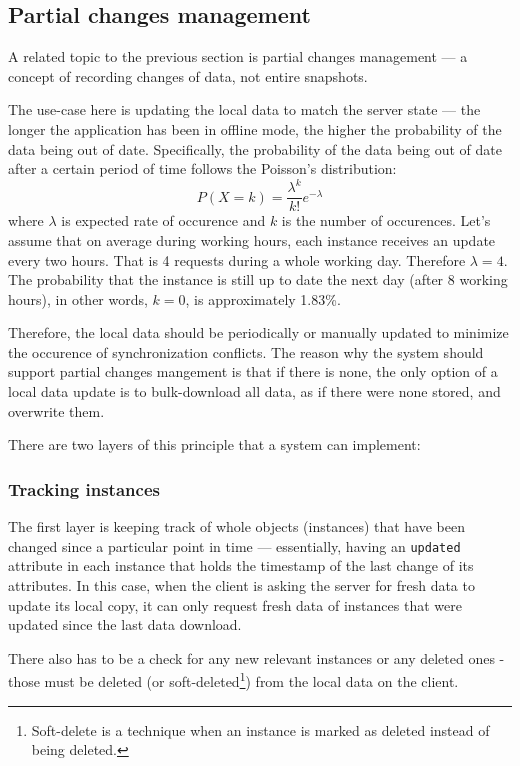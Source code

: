\documentclass[
  digital,     %
  color,       %
  oneside,     %
  nosansbold,  %
  nocolorbold, %
  lof,         %
  lot,         %
]{fithesis4}
\begin{document}
\subsection{Partial changes management}
A related topic to the previous section is partial changes management --- a concept of recording changes of data, not entire snapshots. 

The use-case here is updating the local data to match the server state --- the longer the application has been in offline mode, the higher the probability of the data being out of date. Specifically, the probability of the data being out of date after a certain period of time follows the Poisson's distribution\cite{poissonArticle}: \begin{equation}P(X = k) = \frac{ \lambda^k }{k!} e^{-\lambda} \end{equation} where $\lambda$ is expected rate of occurence and $k$ is the number of occurences. Let's assume that on average during working hours, each instance receives an update every two hours. That is 4 requests during a whole working day. Therefore $\lambda = 4$. The probability that the instance is still up to date the next day (after 8 working hours), in other words, $k = 0$, is approximately 1.83\%.

Therefore, the local data should be periodically or manually updated to minimize the occurence of synchronization conflicts. The reason why the system should support partial changes mangement is that if there is none, the only option of a local data update is to bulk-download all data, as if there were none stored, and overwrite them. 

There are two layers of this principle that a system can implement:

\subsubsection{Tracking instances} 
The first layer is keeping track of whole objects (instances) that have been changed since a particular point in time --- essentially, having an \texttt{updated} attribute in each instance that holds the timestamp of the last change of its attributes. In this case, when the client is asking the server for fresh data to update its local copy, it can only request fresh data of instances that were updated since the last data download. 

There also has to be a check for any new relevant instances or any deleted ones - those must be deleted (or soft-deleted\footnote{Soft-delete is a technique when an instance is marked as deleted instead of being deleted.}) from the local data on the client.
\end{document}
